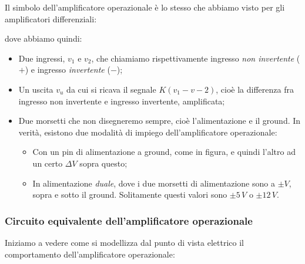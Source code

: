 \documentclass[a4paper,11pt]{article}
\begin{document}
Il simbolo dell'amplificatore operazionale è lo stesso che abbiamo visto per gli amplificatori differenziali:
\begin{center}
\end{center}
dove abbiamo quindi:
\begin{itemize}
	\item Due ingressi, $v_1$ e $v_2$, che chiamiamo rispettivamente ingresso \textit{non invertente} ($+$) e ingresso \textit{invertente} ($-$);
	\item Un uscita $v_u$ da cui si ricava il segnale $K(v_1 - v-2)$, cioè la differenza fra ingresso non invertente e ingresso invertente, amplificata;
	\item Due morsetti che non disegneremo sempre, cioè l'alimentazione e il ground. In verità, esistono due modalità di impiego dell'amplificatore operazionale:
		\begin{itemize}
			\item Con un pin di alimentazione a ground, come in figura, e quindi l'altro ad un certo $\Delta V$ sopra questo;
			\item In alimentazione \textit{duale}, dove i due morsetti di alimentazione sono a $\pm V$, sopra e sotto il ground. Solitamente questi valori sono $\pm 5\, V$ o $\pm 12 \, V$.
		\end{itemize}
\end{itemize}

\subsubsection{Circuito equivalente dell'amplificatore operazionale}
Iniziamo a vedere come si modellizza dal punto di vista elettrico il comportamento dell'amplificatore operazionale:
\end{document}
